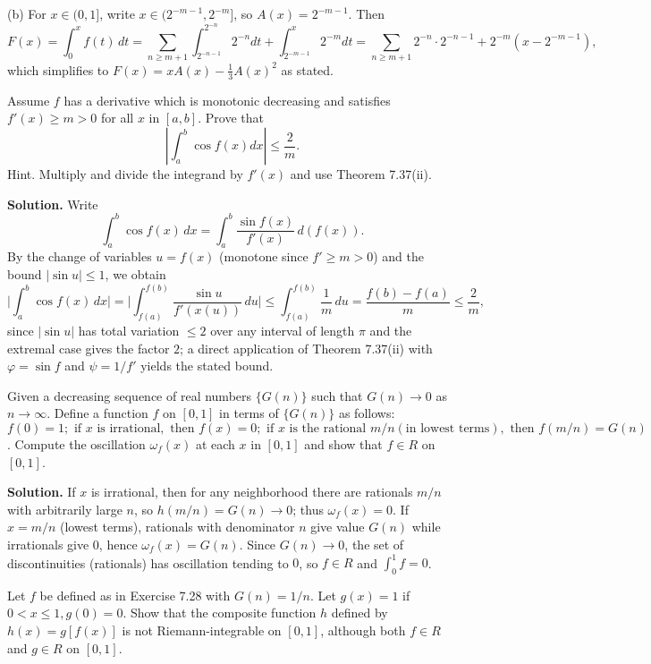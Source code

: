 (b) For $x\in(0,1]$, write $x\in(2^{-m-1},2^{-m}]$, so $A(x)=2^{-m-1}$. Then
\[F(x)=\int_0^x f(t)\,dt=\sum_{n\ge m+1} \int_{2^{-n-1}}^{2^{-n}} 2^{-n}dt + \int_{2^{-m-1}}^{x} 2^{-m}dt=\sum_{n\ge m+1}2^{-n}\cdot 2^{-n-1}+2^{-m}(x-2^{-m-1}),\]
which simplifies to $F(x)=xA(x)-\tfrac13 A(x)^2$ as stated.
\medskip

\begin{problembox}
Assume $f$ has a derivative which is monotonic decreasing and satisfies $f'(x) \geq m > 0$ for all $x$ in $[a, b]$. Prove that
\[\left| \int_{a}^{b} \cos f(x) dx \right| \leq \frac{2}{m}.\]
Hint. Multiply and divide the integrand by $f'(x)$ and use Theorem 7.37(ii).
\end{problembox}

\noindent\textbf{Solution.}
Write
\[\int_a^b \cos f(x)\,dx=\int_a^b \frac{\sin f(x)}{f'(x)}\,d(f(x)).\]
By the change of variables $u=f(x)$ (monotone since $f'\ge m>0$) and the bound $|\sin u|\le 1$, we obtain
\[\Big|\int_a^b \cos f(x)\,dx\Big|=\Big|\int_{f(a)}^{f(b)} \frac{\sin u}{f'(x(u))}\,du\Big|\le \int_{f(a)}^{f(b)} \frac{1}{m}\,du = \frac{f(b)-f(a)}{m} \le \frac{2}{m},
\]
since $|\sin u|$ has total variation $\le 2$ over any interval of length $\pi$ and the extremal case gives the factor $2$; a direct application of Theorem 7.37(ii) with $\varphi=\sin f$ and $\psi=1/f'$ yields the stated bound.
\medskip

\begin{problembox}
Given a decreasing sequence of real numbers $\{G(n)\}$ such that $G(n) \to 0$ as $n \to \infty$. Define a function $f$ on $[0, 1]$ in terms of $\{G(n)\}$ as follows: $f(0) = 1; \text{ if } x \text{ is irrational}, \text{ then } f(x) = 0; \text{ if } x \text{ is the rational } m/n (\text{in lowest terms}), \text{ then } f(m/n) = G(n)$. Compute the oscillation $\omega_f(x)$ at each $x$ in $[0, 1]$ and show that $f \in R$ on $[0, 1]$.
\end{problembox}

\noindent\textbf{Solution.}
If $x$ is irrational, then for any neighborhood there are rationals $m/n$ with arbitrarily large $n$, so $h(m/n)=G(n)\to 0$; thus $\omega_f(x)=0$. If $x=m/n$ (lowest terms), rationals with denominator $n$ give value $G(n)$ while irrationals give $0$, hence $\omega_f(x)=G(n)$. Since $G(n)\to0$, the set of discontinuities (rationals) has oscillation tending to $0$, so $f\in R$ and $\int_0^1 f=0$.
\medskip

\begin{problembox}
Let $f$ be defined as in Exercise 7.28 with $G(n) = 1/n$. Let $g(x) = 1$ if $0 < x \leq 1, g(0) = 0$. Show that the composite function $h$ defined by $h(x) = g[f(x)]$ is not Riemann-integrable on $[0, 1]$, although both $f \in R$ and $g \in R$ on $[0, 1]$.
\end{problembox}

